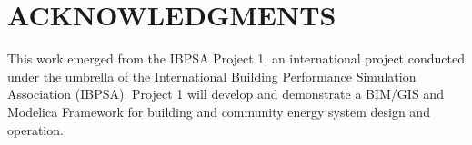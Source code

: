 \documentclass[10pt]{extarticle}
\begin{document}


\vspace{24pt}


\section*{ACKNOWLEDGMENTS}

This work emerged from the IBPSA Project 1, an international project conducted under the umbrella of the International Building Performance Simulation Association (IBPSA). Project 1 will develop and demonstrate a BIM/GIS and Modelica Framework for building and community energy system design and operation.
\end{document}
